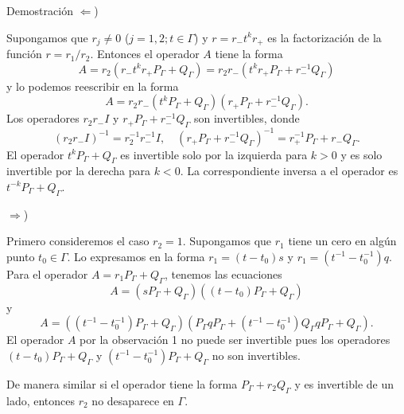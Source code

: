 \documentclass[11pt]{beamer}
\begin{document}
\begin{frame}[shrink]
\begin{block}{Demostración}
$\Leftarrow$)\

Supongamos que $r_{j}\neq 0$ ($j=1,2;t\in\Gamma$) y $r=r_{-}t^{k}r_{+}$ es la factorización de la función $r=r_{1}/r_{2}$. Entonces el operador $A$ tiene la forma \[A=r_{2}(r_{-}t^{k}r_{+}P_\Gamma+Q_{\Gamma})=r_{2}r_{-}(t^{k}r_{+}P_{\Gamma}+r_{-}^{-1}Q_{\Gamma})\] y lo podemos reescribir en la forma \[A=r_{2}r_{-}(t^{k}P_{\Gamma}+Q_{\Gamma})(r_{+}P_{\Gamma}+r_{-}^{-1}Q_{\Gamma}).\] Los operadores $r_{2}r_{-}I$ y $r_{+}P_{\Gamma}+r_{-}^{-1}Q_{\Gamma}$ son invertibles, donde \[(r_{2}r_{-}I)^{-1}=r_{2}^{-1}r_{-}^{-1}I,\quad(r_{+}P_{\Gamma}+r_{-}^{-1}Q_{\Gamma})^{-1}=r_{+}^{-1}P_{\Gamma}+r_{-}Q_{\Gamma}.\] El operador $t^{k}P_{\Gamma}+Q_{\Gamma}$ es invertible solo por la izquierda para $k>0$ y es solo invertible por la derecha para $k<0$. La correspondiente inversa a el operador es $t^{-k}P_{\Gamma}+Q_{\Gamma}$.
\end{block}
\end{frame}

\begin{frame}[shrink]
\begin{block}

$\Rightarrow$)\

Primero consideremos el caso $r_{2}=1$. Supongamos que $r_{1}$ tiene un cero en algún punto $t_{0}\in\Gamma$. Lo expresamos en la forma $r_{1}=(t-t_{0})s$ y $r_{1}=(t^{-1}-t_{0}^{-1})q$. Para el operador $A=r_{1}P_{\Gamma}+Q_{\Gamma}$, tenemos las ecuaciones
\[A=(sP_{\Gamma}+Q_{\Gamma})((t-t_{0})P_{\Gamma}+Q_{\Gamma})\] y \[A=((t^{-1}-t_{0}^{-1})P_{\Gamma}+Q_{\Gamma})(P_{\Gamma}qP_{\Gamma}+(t^{-1}-t_{0}^{-1})Q_{\Gamma}qP_{\Gamma}+Q_{\Gamma}).\] El operador $A$ por la observación 1 no puede ser invertible pues los operadores $(t-t_{0})P_{\Gamma}+Q_{\Gamma}$ y $(t^{-1}-t_{0}^{-1})P_{\Gamma}+Q_{\Gamma}$ no son invertibles.\

De manera similar si el operador tiene la forma $P_{\Gamma}+r_{2}Q_{\Gamma}$ y es invertible de un lado, entonces $r_{2}$ no desaparece en $\Gamma$.
\end{block}
\end{frame}
\end{document}

